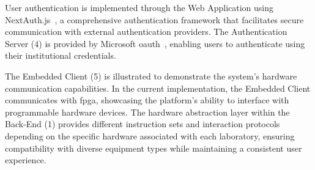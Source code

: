 User authentication is implemented through the Web Application using NextAuth.js~\cite{nextjs-authentication}, a comprehensive authentication framework that facilitates secure communication with external authentication providers. The Authentication Server (4) is provided by Microsoft \ac{oauth}~\cite{microsoft-oauth}, enabling users to authenticate using their institutional credentials.

The Embedded Client (5) is illustrated to demonstrate the system's hardware communication capabilities. In the current implementation, the Embedded Client communicates with \ac{fpga}, showcasing the platform's ability to interface with programmable hardware devices. The hardware abstraction layer within the Back-End (1) provides different instruction sets and interaction protocols depending on the specific hardware associated with each laboratory, ensuring compatibility with diverse equipment types while maintaining a consistent user experience.